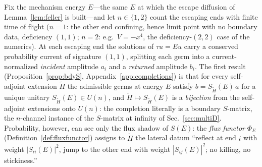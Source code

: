 \documentclass[11pt]{article}
\theoremstyle{definition}
\theoremstyle{remark}
\begin{document}
Fix the mechanism energy $E$---the same $E$ at which the escape
diffusion of Lemma~\ref{lem:feller} is built---and let $n\in\{1,2\}$
count the escaping ends with finite time of flight ($n=1$: the other end
confining, hence limit point with no boundary data, deficiency $(1,1)$;
$n=2$: e.g.\ $V=-x^{4}$, the deficiency-$(2,2)$ case of the numerics).
At each escaping end the solutions of $\tau u=Eu$ carry a conserved
probability current of signature $(1,1)$, splitting each germ into a
current-normalized \emph{incident} amplitude $a_{i}$ and a
\emph{returned} amplitude $b_{i}$. The first result
(Proposition~\ref{prop:bdyS}, Appendix~\ref{app:completions}) is that
for every self-adjoint extension $\tilde H$ the admissible germs at
energy $E$ satisfy $b=S_{\tilde H}(E)\,a$ for a unique unitary
$S_{\tilde H}(E)\in U(n)$, and $\tilde H\mapsto S_{\tilde H}(E)$ is a
\emph{bijection} from the self-adjoint extensions onto $U(n)$: the
completion literally is a boundary $S$-matrix, the $n$-channel instance
of the $S$-matrix at infinity of Sec.~\ref{sec:multiD}. Probability,
however, can see only the flux shadow of $S(E)$: the \emph{flux functor}
$\Phi_{E}$ (Definition~\ref{def:fluxfunctor}) assigns to $\tilde H$ the
lateral datum ``reflect at end $i$ with weight $|S_{ii}(E)|^{2}$, jump
to the other end with weight $|S_{ij}(E)|^{2}$; no killing, no
stickiness.''
\end{document}
